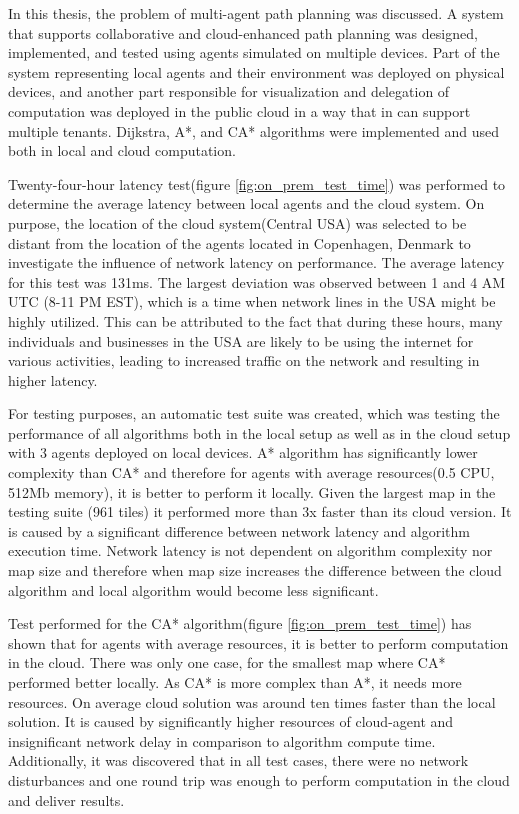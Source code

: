 In this thesis, the problem of multi-agent path planning was discussed. A system that supports collaborative and cloud-enhanced path planning was designed, implemented, and tested using agents simulated on multiple devices. Part of the system representing local agents and their environment was deployed on physical devices, and another part responsible for visualization and delegation of computation was deployed in the public cloud in a way that in can support multiple tenants. Dijkstra, A*, and CA* algorithms were implemented and used both in local and cloud computation.

Twenty-four-hour latency test(figure \ref{fig:on_prem_test_time}) was performed to determine the average latency between local agents and the cloud system. On purpose, the location of the cloud system(Central USA) was selected to be distant from the location of the agents located in Copenhagen, Denmark to investigate the influence of network latency on performance. The average latency for this test was 131ms. The largest deviation was observed between 1 and 4 AM UTC (8-11 PM EST), which is a time when network lines in the USA might be highly utilized. This can be attributed to the fact that during these hours, many individuals and businesses in the USA are likely to be using the internet for various activities, leading to increased traffic on the network and resulting in higher latency. 

For testing purposes, an automatic test suite was created, which was testing the performance of all algorithms both in the local setup as well as in the cloud setup with 3 agents deployed on local devices. A* algorithm has significantly lower complexity  than CA* and therefore for agents with average resources(0.5 CPU, 512Mb memory), it is better to perform it locally. Given the largest map in the testing suite (961 tiles) it performed more than 3x faster than its cloud version. It is caused by a significant difference between network latency and algorithm execution time. Network latency is not dependent on algorithm complexity nor map size and therefore when map size increases the difference between the cloud algorithm and local algorithm would become less significant.

Test performed for the CA* algorithm(figure \ref{fig:on_prem_test_time}) has shown that for agents with average resources, it is better to perform computation in the cloud. There was only one case, for the smallest map where CA* performed better locally. As CA* is more complex than A*, it needs more resources. On average cloud solution was around ten times faster than the local solution. It is caused by significantly higher resources of cloud-agent and insignificant network delay in comparison to algorithm compute time. Additionally, it was discovered that in all test cases, there were no network disturbances and one round trip was enough to perform computation in the cloud and deliver results.

